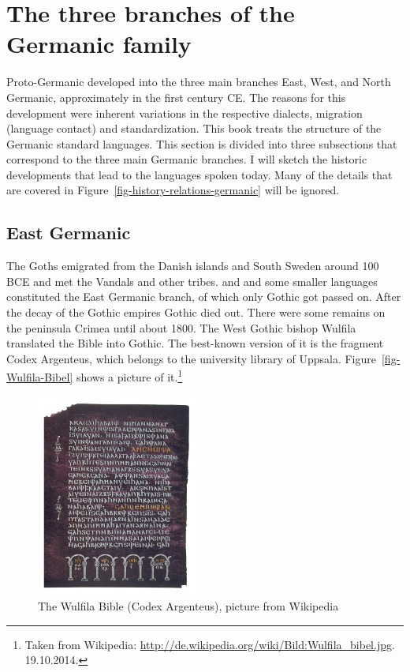 




\section{The three branches of the Germanic family}

Proto-Germanic developed into the three main branches East, West, and North Germanic, approximately in
the first century CE. The reasons for this development were inherent variations in the respective
dialects, migration (language contact) and standardization. This book treats the structure of the
Germanic standard languages. This section is divided into three subsections that correspond to the
three main Germanic branches. I will sketch the historic developments that lead to the
languages spoken today. Many of the details that are covered in Figure~\ref{fig-history-relations-germanic} will be ignored.



\subsection{East Germanic}

The Goths emigrated from the Danish islands and South Sweden around 100 BCE and met the
Vandals and other tribes.   and  and some smaller languages constituted the East Germanic branch, of which only Gothic got passed on.
After the decay of the Gothic empires Gothic died out. There were some remains on the peninsula
Crimea until about 1800. The West Gothic bishop Wulfila translated the Bible into Gothic. The
best-known version of it is the fragment Codex Argenteus, which belongs to the university library of
Uppsala. Figure~\vref{fig-Wulfila-Bibel} shows a picture of it.\footnote{
Taken from Wikipedia: \url{http://de.wikipedia.org/wiki/Bild:Wulfila_bibel.jpg}. 19.10.2014.
}
\begin{figure}
\includegraphics[width=53mm]{Pictures/Wulfila_bibel}
\caption{\label{fig-Wulfila-Bibel}The Wulfila Bible (Codex Argenteus), picture from Wikipedia}
\end{figure}



